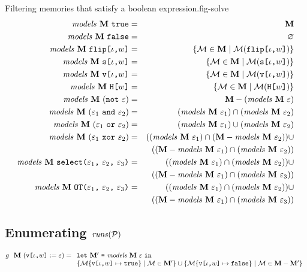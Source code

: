 \begin{fpfig}[t]{Filtering memories that satisfy a boolean expression.}{fig-solve}
\begin{eqnarray*}
\solve{\stores}{\etrue} &=& \stores\\
\solve{\stores}{\efalse} &=& \varnothing\\
\solve{\stores}{\flip{\cid}{w}} &=& \{ \store \in \stores \mid \store(\flip{\cid}{w}) \} \\
\solve{\stores}{\secret{\cid}{w}} &=& \{ \store \in \stores \mid \store(\secret{\cid}{w}) \} \\
\solve{\stores}{\view{\cid}{w}} &=& \{ \store \in \stores \mid \store(\view{\cid}{w}) \} \\
\solve{\stores}{\oracle{w}} &=& \{ \store \in \stores \mid \store(\oracle{w}) \} \\
\solve{\stores}{(\enot\ \be)} &=& \stores - (\solve{\stores}{\be})\\
\solve{\stores}{(\be_1\ \eand\ \be_2)} &=& (\solve{\stores}{\be_1}) \cap (\solve{\stores}{\be_2}) \\
\solve{\stores}{(\be_1\ \eor\ \be_2)} &=& (\solve{\stores}{\be_1}) \cup (\solve{\stores}{\be_2}) \\
\solve{\stores}{(\be_1\ \exor\ \be_2)} &=&
 ((\solve{\stores}{\be_1}) \cap (\stores - \solve{\stores}{\be_2})) \cup\\
 && ((\stores - \solve{\stores}{\be_1}) \cap (\solve{\stores}{\be_2})) \\
\solve{\stores}{\select{\be_1}{\be_2}{\be_3}} &=&
 ((\solve{\stores}{\be_1}) \cap (\solve{\stores}{\be_2})) \cup \\
 && ((\stores - \solve{\stores}{\be_1}) \cap (\solve{\stores}{\be_3})) \\
\solve{\stores}{\OT{\be_1}{\be_2}{\be_3}} &=&
 ((\solve{\stores}{\be_1}) \cap (\solve{\stores}{\be_2})) \cup\\
 && ((\stores - \solve{\stores}{\be_1}) \cap (\solve{\stores}{\be_3}))
\end{eqnarray*}
\end{fpfig}

\subsection{Enumerating $\runs(\prog)$}



$$
g\ \ \stores\ (\eassign{\view{\cid}{w}}{\be}) =\begin{array}[t]{l}
\elet{\stores'}{\solve{\stores}{\be}}{}\\
  \{\extend{\store}{\view{\cid}{w}}{\etrue} \mid \store \in \stores' \} \cup
  \{\extend{\store}{\view{\cid}{w}}{\efalse} \mid \store \in \stores - \stores' \}\end{array}
$$

